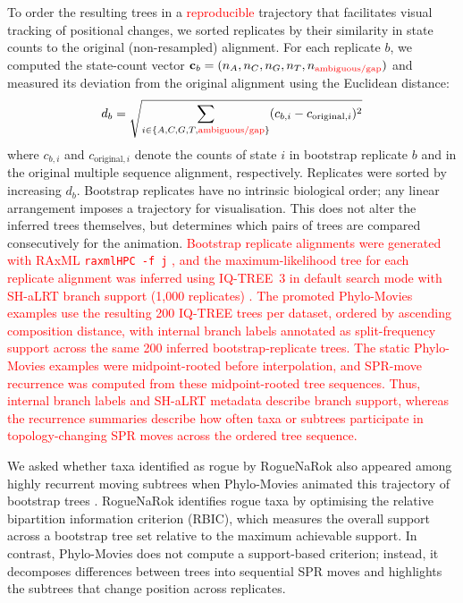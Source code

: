 To order the resulting trees in a \textcolor{red}{reproducible} trajectory that facilitates visual tracking of positional changes, we sorted replicates by their similarity in state counts to the original (non-resampled) alignment. For each replicate $b$, we computed the state-count vector $\mathbf{c}_b = (n_A, n_C, n_G, n_T, n_{\text{\textcolor{red}{ambiguous/gap}}})$ and measured its deviation from the original alignment using the Euclidean distance:
\begin{equation}
d_b = \sqrt{\sum_{i \in \{A,C,G,T,\text{\textcolor{red}{ambiguous/gap}}\}} (c_{b,i} - c_{\text{original},i})^2}
\end{equation}
\noindent where $c_{b,i}$ and $c_{\text{original},i}$ denote the counts of state $i$ in bootstrap replicate $b$ and in the original multiple sequence alignment, respectively. Replicates were sorted by increasing $d_b$. Bootstrap replicates have no intrinsic biological order; any linear arrangement imposes a trajectory for visualisation. This does not alter the inferred trees themselves, but determines which pairs of trees are compared consecutively for the animation. \textcolor{red}{Bootstrap replicate alignments were generated with RAxML \texttt{raxmlHPC -f j} \citep{Stamatakis2014}, and the maximum-likelihood tree for each replicate alignment was inferred using IQ-TREE~3 in default search mode with SH-aLRT branch support (1{,}000 replicates) \citep{Wong2026IQTREE3}. The promoted Phylo-Movies examples use the resulting 200 IQ-TREE trees per dataset, ordered by ascending composition distance, with internal branch labels annotated as split-frequency support across the same 200 inferred bootstrap-replicate trees. The static Phylo-Movies examples were midpoint-rooted before interpolation, and SPR-move recurrence was computed from these midpoint-rooted tree sequences. Thus, internal branch labels and SH-aLRT metadata describe branch support, whereas the recurrence summaries describe how often taxa or subtrees participate in topology-changing SPR moves across the ordered tree sequence.}

We asked whether taxa identified as rogue by RogueNaRok also appeared among highly recurrent moving subtrees when Phylo-Movies animated this trajectory of bootstrap trees \citep{Aberer2013RogueNaRok}. RogueNaRok identifies rogue taxa by optimising the relative bipartition information criterion (RBIC), which measures the overall support across a bootstrap tree set relative to the maximum achievable support. In contrast, Phylo-Movies does not compute a support-based criterion; instead, it decomposes differences between trees into sequential SPR moves and highlights the subtrees that change position across replicates. 

